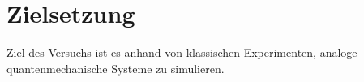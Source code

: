 \section{Zielsetzung}
\label{sec:Zielsetzung}

Ziel des Versuchs ist es anhand von klassischen Experimenten, analoge quantenmechanische Systeme zu simulieren.